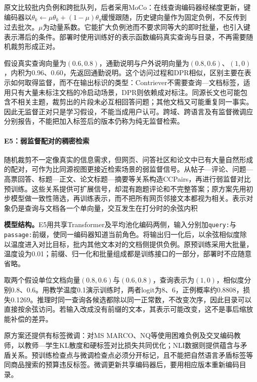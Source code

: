 原文比较批内负例和跨批队列，后者采用MoCo：在线查询编码器经梯度更新，键编码器以$\theta_k\leftarrow\mu\theta_k+(1-\mu)\theta_q$缓慢跟随，历史键向量作为固定负例，不反传到过去批次。$\mu$为动量系数。它能扩大负例池而不要求同等大的即时批量，也引入键表示滞后的条件。部署时使用训练好的表示函数编码真实查询与目录，不再需要随机裁剪形成正对。

假设真实查询向量为$(0.6,0.8)$，通勤说明与户外说明向量为$(0.8,0.6)$、$(1,0)$，内积为0.96、0.60，先返回通勤说明。这个访问过程和DPR相似，区别主要在表示如何取得监督，而不在输出标识的类型：Contriever不需要查询—文档标签，适用只有大量未标注文档的冷启动场景，DPR则依赖成对标注。同源长文也可能包含不相关主题，裁剪出的片段未必互相回答问题；其他文档又可能重复同一事实。因此无监督正对只是学习假设，不能当成用户认可。跨域、跨语言及有监督微调应分别报告，不能把加入标签后的版本仍称为纯无监督检索。

\Needspace{100mm}
\paragraph{E5：弱监督配对的稠密检索}
\label{sec:rs-search-e5}

随机裁剪不一定像真实的信息需求，但网页、问答社区和论文中已有大量自然形成的配对，可作为比同源视图更接近检索场景的弱监督信号。从帖子—评论、问题—高票回答、标题—正文、论文标题—摘要等关系构造CCPairs，再进行弱监督对比预训练。这些关系提供可扩展信号，却混有跑题评论和不完整答案；原方案先用初步模型做一致性筛选，再训练表示，而不把所有网页邻接文本都视为相关。表示对象仍是查询与文档各一个单向量，交互发生在打分时的余弦内积

\textbf{模型结构。}E5用共享Transformer及平均池化编码两侧，输入分别加\texttt{query:}与\texttt{passage:}前缀，使同一编码器知道当前角色。将输出归一化后，以余弦相似度除以温度进入对比目标，批内其他文本对的文档侧提供负例。原预训练采用大批量，温度设为0.01；前缀、归一化和批量组成都是训练接口的一部分，部署时不应随意省略。

取两个假设单位文档向量$(0.8,0.6)$与$(0.6,0.8)$，查询表示为$(1,0)$，相似度分别0.8、0.6。用教学温度0.1演示训练时，两者logit为8、6，正例概率约0.8808，损失0.1269。推理时同一查询各候选都除以同一正常数，不改变次序，因此目录可以直接按余弦访问。若输入改成没有前缀的文本，其表示可能改变，这不是事后缩放能补偿的差异。

原方案还提供有标签微调：对MS MARCO、NQ等使用困难负例及交叉编码教师，以教师—学生KL散度和硬标签对比损失共同优化；NLI数据则提供蕴含与矛盾关系。预训练检查点与微调检查点必须分开标记，且不能把自然语言矛盾标签等同商品搜索的预算违反标签。微调更新共享编码器后，要用相应版本重新编码目录。

